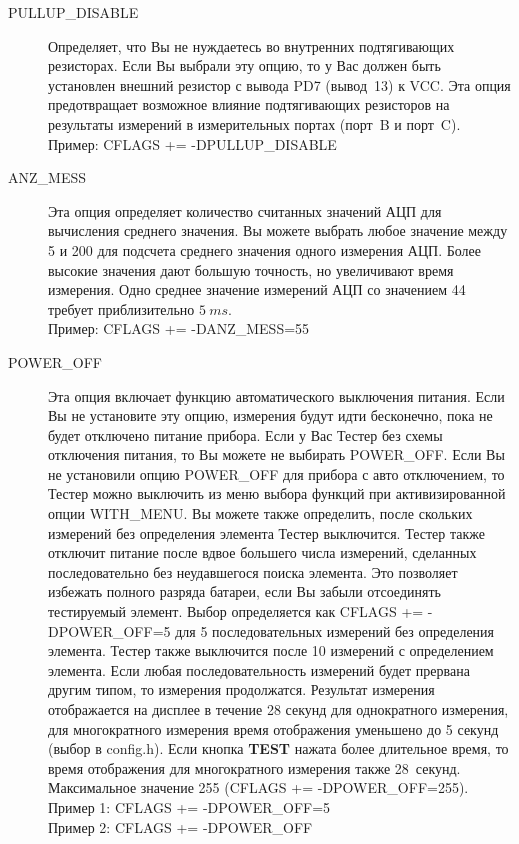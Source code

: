 \begin{description}
  \item[PULLUP\_DISABLE] Определяет, что Вы не нуждаетесь во внутренних подтягивающих резисторах. Если Вы выбрали 
эту опцию, то у Вас должен быть установлен внешний резистор с вывода PD7 (вывод~13) к VCC. Эта опция предотвращает 
возможное влияние подтягивающих резисторов на результаты измерений в измерительных портах (порт~B и порт~C).\\
Пример: CFLAGS += -DPULLUP\_DISABLE

  \item[ANZ\_MESS] Эта опция определяет количество считанных значений АЦП для вычисления среднего значения. 
Вы можете выбрать любое значение между 5 и 200 для подсчета среднего значения одного измерения АЦП. Более 
высокие значения дают большую точность, но увеличивают время измерения. Одно среднее значение измерений АЦП 
со значением 44 требует приблизительно \(5~ms\).\\
Пример: CFLAGS += -DANZ\_MESS=55

  \item[POWER\_OFF] Эта опция включает функцию автоматического выключения питания. Если Вы не установите эту опцию, 
измерения будут идти бесконечно, пока не будет отключено питание прибора. Если у Вас Тестер без 
схемы отключения питания, то Вы можете не выбирать POWER\_OFF.
Если Вы не установили опцию POWER\_OFF для прибора с авто отключением, то Тестер можно выключить из меню 
выбора функций при активизированной опции WITH\_MENU.
Вы можете также определить, после скольких измерений без определения элемента Тестер выключится. Тестер также 
отключит питание после вдвое большего числа измерений, сделанных последовательно без неудавшегося поиска элемента. 
Это позволяет избежать полного разряда батареи, если Вы забыли отсоединять тестируемый элемент. Выбор определяется 
как CFLAGS += -DPOWER\_OFF=5 для 5 последовательных измерений без определения элемента. Тестер также выключится 
после 10 измерений с определением элемента. Если любая последовательность измерений будет прервана другим типом, 
то измерения продолжатся. Результат измерения отображается на дисплее в течение 28 секунд для однократного 
измерения, для многократного измерения время отображения уменьшено до 5 секунд (выбор в config.h). Если кнопка 
\textbf{ TEST} нажата более длительное время, то время отображения для многократного измерения также 28~секунд. 
Максимальное значение 255 (CFLAGS += -DPOWER\_OFF=255).\\
Пример 1: CFLAGS += -DPOWER\_OFF=5\\
Пример 2: CFLAGS += -DPOWER\_OFF


\end{description}

